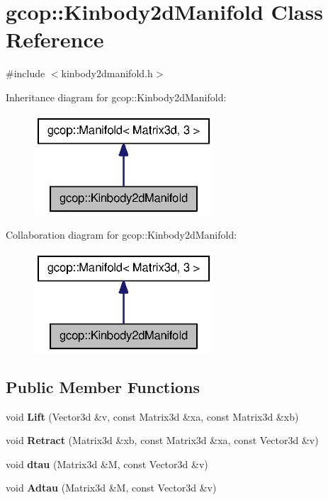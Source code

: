 \section{gcop\-:\-:\-Kinbody2d\-Manifold \-Class \-Reference}
\label{classgcop_1_1Kinbody2dManifold}


{\ttfamily \#include $<$kinbody2dmanifold.\-h$>$}



\-Inheritance diagram for gcop\-:\-:\-Kinbody2d\-Manifold\-:\nopagebreak
\begin{figure}[H]
\begin{center}
\leavevmode
\includegraphics[width=190pt]{classgcop_1_1Kinbody2dManifold__inherit__graph}
\end{center}
\end{figure}


\-Collaboration diagram for gcop\-:\-:\-Kinbody2d\-Manifold\-:\nopagebreak
\begin{figure}[H]
\begin{center}
\leavevmode
\includegraphics[width=190pt]{classgcop_1_1Kinbody2dManifold__coll__graph}
\end{center}
\end{figure}
\subsection*{\-Public \-Member \-Functions}
\begin{DoxyCompactItemize}
\item 
void {\bf \-Lift} (\-Vector3d \&v, const \-Matrix3d \&xa, const \-Matrix3d \&xb)
\item 
void {\bf \-Retract} (\-Matrix3d \&xb, const \-Matrix3d \&xa, const \-Vector3d \&v)
\item 
void {\bf dtau} (\-Matrix3d \&\-M, const \-Vector3d \&v)
\item 
void {\bf \-Adtau} (\-Matrix3d \&\-M, const \-Vector3d \&v)
\end{DoxyCompactItemize}
